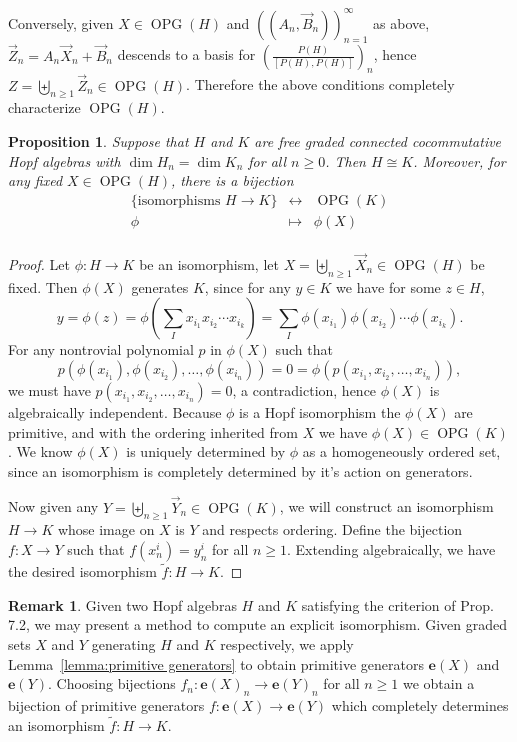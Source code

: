 \documentclass[11pt]{amsart}
\newtheorem{proposition}[theorem]{Proposition}
\theoremstyle{definition}
\newtheorem{remark}[theorem]{Remark}
\numberwithin{equation}{section}
\DeclareMathOperator{\OPG}{OPG}
\begin{document}
Conversely, given $X \in \OPG(H)$ and $((A_n,\vec{B}_n))_{n=1}^\infty$ as above, $\vec{Z}_n = A_n\vec{X}_n + \vec{B}_n$ descends to a basis for $\displaystyle \left( \frac{P(H)}{[P(H),P(H)]} \right)_n$, hence $Z = \biguplus_{n \geq 1}\vec{Z}_n \in \OPG(H)$. Therefore the above conditions completely characterize $\OPG(H)$.

\begin{proposition}
Suppose that $H$ and $K$ are free graded connected cocommutative Hopf algebras with $\dim H_n = \dim K_n$ for all $n \geq 0$.  Then $H \cong K$.  Moreover, for any fixed $X \in \OPG(H)$, there is a bijection
\[
\begin{array}{rcl}
\{\text{isomorphisms $H \to K$}\} &\leftrightarrow& \OPG(K) \\
\phi & \mapsto & \phi(X) \\
\end{array}
\]
	
	
\end{proposition}

\begin{proof}
	Let $\phi : H \to K$ be an isomorphism, let $X = \biguplus_{n \geq 1} \vec{X}_n \in \OPG(H)$ be fixed. Then $\phi(X)$ generates $K$, since for any $y \in K$ we have for some $z \in H$,
    \[
    y = \phi(z) = \phi(\sum_{I} x_{i_1}x_{i_2}\cdots x_{i_k}) = \sum_{I} \phi(x_{i_1})\phi(x_{i_2})\cdots \phi(x_{i_k}).
    \]
    For any nontrovial polynomial $p$ in $\phi(X)$ such that 
    \[
    p(\phi(x_{i_1}),\phi(x_{i_2}),\ldots ,\phi(x_{i_n})) = 0 = \phi(p(x_{i_1},x_{i_2},\ldots ,x_{i_n})),
    \]
    we must have $p(x_{i_1},x_{i_2},\ldots ,x_{i_n}) = 0$, a contradiction, hence $\phi(X)$ is algebraically independent. Because $\phi$ is a Hopf isomorphism the $\phi(X)$ are primitive, and with the ordering inherited from $X$ we have $\phi(X) \in \OPG(K)$. We know $\phi(X)$ is uniquely determined by $\phi$ as a homogeneously ordered set, since an isomorphism is completely determined by it's action on generators.

    Now given any $Y = \biguplus_{n \geq 1} \vec{Y}_n \in \OPG(K)$, we will construct an isomorphism $H \to K$ whose image on $X$ is $Y$ and respects ordering. Define the bijection $f:X \to Y$ such that $f(x_n^i) = y_n^i$ for all $n \geq 1$. Extending algebraically, we have the desired isomorphism $\tilde{f}:H \to K$.
\end{proof}

\begin{remark}
    Given two Hopf algebras $H$ and $K$ satisfying the criterion of Prop. 7.2, we may present a method to compute an explicit isomorphism. Given graded sets $X$ and $Y$ generating $H$ and $K$ respectively, we apply Lemma~\ref{lemma:primitive generators} to obtain primitive generators $\mathbf{e}(X)$ and $\mathbf{e}(Y)$. Choosing bijections $f_n:\mathbf{e}(X)_n \to \mathbf{e}(Y)_n$ for all $n \geq 1$ we obtain a bijection of primitive generators $f:\mathbf{e}(X) \to \mathbf{e}(Y)$ which completely determines an isomorphism $\tilde{f}:H \to K$.
\end{remark}
\end{document}
